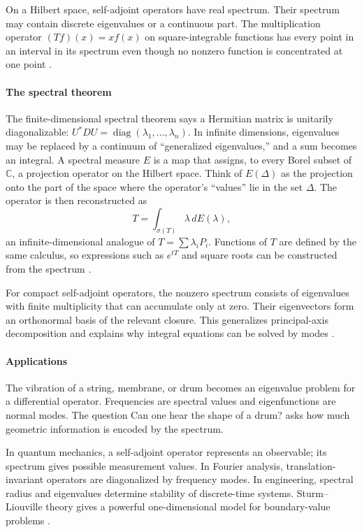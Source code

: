 On a Hilbert space, self-adjoint operators have real spectrum. Their spectrum may contain discrete eigenvalues or a continuous part. The multiplication operator $(Tf)(x)=xf(x)$ on square-integrable functions has every point in an interval in its spectrum even though no nonzero function is concentrated at one point \cite{spectral_ref3}.

\paragraph{The spectral theorem}
The finite-dimensional spectral theorem says a Hermitian matrix is unitarily diagonalizable: $U^*DU=\operatorname{diag}(\lambda_1,\ldots,\lambda_n)$. In infinite dimensions, eigenvalues may be replaced by a continuum of ``generalized eigenvalues,'' and a sum becomes an integral. A spectral measure $E$ is a map that assigns, to every Borel subset of $\mathbb{C}$, a projection operator on the Hilbert space. Think of $E(\Delta)$ as the projection onto the part of the space where the operator's ``values'' lie in the set $\Delta$. The operator is then reconstructed as
\[
 T=\int_{\sigma(T)}\lambda\,dE(\lambda),
\]
an infinite-dimensional analogue of $T=\sum\lambda_i P_i$. Functions of $T$ are defined by the same calculus, so expressions such as $e^{tT}$ and square roots can be constructed from the spectrum \cite{spectral_ref3}.

For compact self-adjoint operators, the nonzero spectrum consists of eigenvalues with finite multiplicity that can accumulate only at zero. Their eigenvectors form an orthonormal basis of the relevant closure. This generalizes principal-axis decomposition and explains why integral equations can be solved by modes \cite{spectral_ref1}.

\paragraph{Applications}
The vibration of a string, membrane, or drum becomes an eigenvalue problem for a differential operator. Frequencies are spectral values and eigenfunctions are normal modes. The question Can one hear the shape of a drum? asks how much geometric information is encoded by the spectrum.

In quantum mechanics, a self-adjoint operator represents an observable; its spectrum gives possible measurement values. In Fourier analysis, translation-invariant operators are diagonalized by frequency modes. In engineering, spectral radius and eigenvalues determine stability of discrete-time systems. Sturm--Liouville theory gives a powerful one-dimensional model for boundary-value problems \cite{spectral_ref4}.

